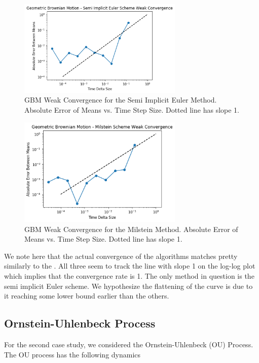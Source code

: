 \documentclass[onecolumn,notitlepage,pra,10pt,aps]{revtex4-1}
\begin{document}
  \begin{figure}[H]
    \centering
      \includegraphics[width=0.7\textwidth]{gbm_semi.png}
    \caption{GBM Weak Convergence for the Semi Implicit Euler Method. Absolute Error of Means vs. Time Step Size. Dotted line has slope 1.}
  \end{figure}

  \begin{figure}[H]
    \centering
      \includegraphics[width=0.7\textwidth]{gbm_milstein.png}
    \caption{GBM Weak Convergence for the Milstein Method. Absolute Error of Means vs. Time Step Size. Dotted line has slope 1.}
  \end{figure}

  We note here that the actual convergence of the algorithms matches pretty similarly to the . All three seem to track the line with slope 1 on the log-log plot which implies that the convergence rate is 1. The only method in question is the semi implicit Euler scheme. We hypothesize the flattening of the curve is due to it reaching some lower bound earlier than the others.

  \subsection{Ornstein-Uhlenbeck Process}

  For the second case study, we considered the Ornstein-Uhlenbeck (OU) Process. The OU process has the following dynamics
\end{document}
